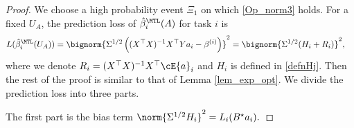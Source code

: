 \documentclass[aos,preprint]{imsart}
\begin{document}
	\begin{proof}%
	We choose a high probability event $\Xi_1$ on which \eqref{Op_norm3} holds.	
	For a fixed $U_A$, the prediction loss of $\hat{\beta}_i^{\MTL}(A)$ for task $i$ is  
	\begin{align*}
		L(\hat{\beta}_i^{\MTL}(U_A)) %
		&= \bignorm{\Sigma^{1/2} \left((X^{\top} X)^{-1} X^{\top} Y a_i - \beta^{(i)}\right)}^2  = \bignorm{\Sigma^{1/2} (H_i + R_i)}^2,
	\end{align*}
	where we denote $R_i = (X^{\top} X)^{-1} X^{\top} \cE  {a}_i$ and $H_i$ is defined in \eqref{defnHj}. Then the rest of the proof is similar to that of Lemma \ref{lem_exp_opt}. We divide the prediction loss into three parts. 
	
	\medskip
	 The first part is the bias term $\norm{\Sigma^{1/2}H_i}^2 = L_i(B^{\star}  {a}_i).$


\end{proof}
\end{document}
